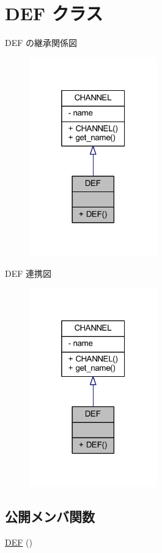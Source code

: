 \hypertarget{class_d_e_f}{}\section{D\+EF クラス}
\label{class_d_e_f}


D\+EF の継承関係図\nopagebreak
\begin{figure}[H]
\begin{center}
\leavevmode
\includegraphics[width=157pt]{class_d_e_f__inherit__graph}
\end{center}
\end{figure}


D\+EF 連携図\nopagebreak
\begin{figure}[H]
\begin{center}
\leavevmode
\includegraphics[width=157pt]{class_d_e_f__coll__graph}
\end{center}
\end{figure}
\subsection*{公開メンバ関数}
\begin{DoxyCompactItemize}
\item 
\hyperlink{class_d_e_f_a359a19dbba360787927e4a30485c6cde}{D\+EF} ()
\end{DoxyCompactItemize}


